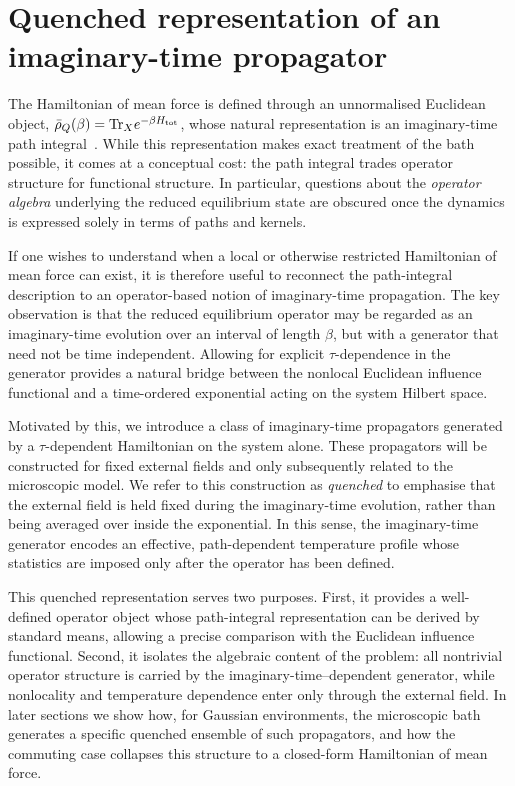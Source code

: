 \section{Quenched representation of an imaginary-time propagator\label{sec:quenched}}

The Hamiltonian of mean force is defined through an unnormalised Euclidean object,
$\bar\rho_Q(\beta)=\mathrm{Tr}_X e^{-\beta H_{\mathrm{tot}}}$, whose natural representation
is an imaginary-time path integral~\cite{feynmanQuantumMechanicsPath1965, kleinertPathIntegralsQuantum2009}. While this representation makes exact treatment of the bath possible, it comes at a conceptual cost: the path
integral trades operator structure for functional structure. In particular,
questions about the \emph{operator algebra} underlying the reduced equilibrium
state are obscured once the dynamics is expressed solely in terms of paths and
kernels.

If one wishes to understand when a local or otherwise restricted Hamiltonian of
mean force can exist, it is therefore useful to reconnect the path-integral
description to an operator-based notion of imaginary-time propagation. The key
observation is that the reduced equilibrium operator may be regarded as an
imaginary-time evolution over an interval of length $\beta$, but with a generator
that need not be time independent. Allowing for explicit $\tau$-dependence in
the generator provides a natural bridge between the nonlocal Euclidean influence
functional and a time-ordered exponential acting on the system Hilbert space.

Motivated by this, we introduce a class of imaginary-time propagators generated
by a $\tau$-dependent Hamiltonian on the system alone. These propagators will be
constructed for fixed external fields and only subsequently related to the
microscopic model. We refer to this construction as \emph{quenched} to emphasise
that the external field is held fixed during the imaginary-time evolution,
rather than being averaged over inside the exponential. In this sense, the
imaginary-time generator encodes an effective, path-dependent temperature
profile whose statistics are imposed only after the operator has been defined.

This quenched representation serves two purposes. First, it provides a
well-defined operator object whose path-integral representation can be derived
by standard means, allowing a precise comparison with the Euclidean influence
functional. Second, it isolates the algebraic content of the problem: all
nontrivial operator structure is carried by the imaginary-time–dependent
generator, while nonlocality and temperature dependence enter only through the
external field. In later sections we show how, for Gaussian environments, the
microscopic bath generates a specific quenched ensemble of such propagators,
and how the commuting case collapses this structure to a closed-form Hamiltonian
of mean force.

